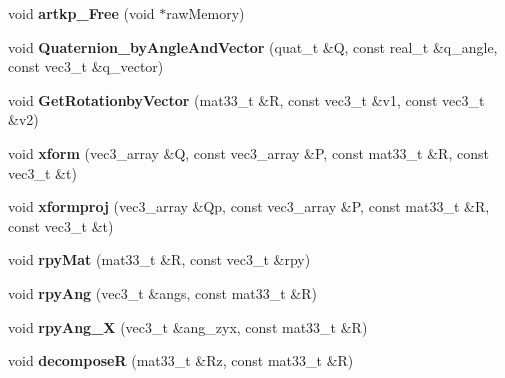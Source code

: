 \begin{DoxyCompactItemize}
\item 
void {\bfseries artkp\+\_\+\+Free} (void $\ast$raw\+Memory)\hypertarget{namespacekukadu_ada2c100ed5317061008b91f9d91b0366}{}\label{namespacekukadu_ada2c100ed5317061008b91f9d91b0366}

\item 
void {\bfseries Quaternion\+\_\+by\+Angle\+And\+Vector} (quat\+\_\+t \&Q, const real\+\_\+t \&q\+\_\+angle, const vec3\+\_\+t \&q\+\_\+vector)\hypertarget{namespacekukadu_aa4bf669b534e79a2347c38f22f9e778b}{}\label{namespacekukadu_aa4bf669b534e79a2347c38f22f9e778b}

\item 
void {\bfseries Get\+Rotationby\+Vector} (mat33\+\_\+t \&R, const vec3\+\_\+t \&v1, const vec3\+\_\+t \&v2)\hypertarget{namespacekukadu_ab0103fbe5ac266ceeb7d8b2c6ed831fd}{}\label{namespacekukadu_ab0103fbe5ac266ceeb7d8b2c6ed831fd}

\item 
void {\bfseries xform} (vec3\+\_\+array \&Q, const vec3\+\_\+array \&P, const mat33\+\_\+t \&R, const vec3\+\_\+t \&t)\hypertarget{namespacekukadu_a8f2d712ed2dc5dfb8182f55e7acdc06f}{}\label{namespacekukadu_a8f2d712ed2dc5dfb8182f55e7acdc06f}

\item 
void {\bfseries xformproj} (vec3\+\_\+array \&Qp, const vec3\+\_\+array \&P, const mat33\+\_\+t \&R, const vec3\+\_\+t \&t)\hypertarget{namespacekukadu_aa76e85a6643b0290a321d25cc719c5a3}{}\label{namespacekukadu_aa76e85a6643b0290a321d25cc719c5a3}

\item 
void {\bfseries rpy\+Mat} (mat33\+\_\+t \&R, const vec3\+\_\+t \&rpy)\hypertarget{namespacekukadu_a4afe75626c33ba9fd735d8202a6bfd53}{}\label{namespacekukadu_a4afe75626c33ba9fd735d8202a6bfd53}

\item 
void {\bfseries rpy\+Ang} (vec3\+\_\+t \&angs, const mat33\+\_\+t \&R)\hypertarget{namespacekukadu_ac588181a9b6fbb9185de1a1ac1330ad4}{}\label{namespacekukadu_ac588181a9b6fbb9185de1a1ac1330ad4}

\item 
void {\bfseries rpy\+Ang\+\_\+X} (vec3\+\_\+t \&ang\+\_\+zyx, const mat33\+\_\+t \&R)\hypertarget{namespacekukadu_aca606c8cc95a78740e17f98f364ef631}{}\label{namespacekukadu_aca606c8cc95a78740e17f98f364ef631}

\item 
void {\bfseries decomposeR} (mat33\+\_\+t \&Rz, const mat33\+\_\+t \&R)\hypertarget{namespacekukadu_aaad0456bf901f155e09cd662c726e58a}{}\label{namespacekukadu_aaad0456bf901f155e09cd662c726e58a}


\end{DoxyCompactItemize}
